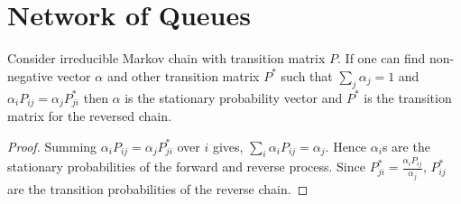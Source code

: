 \documentclass[a4paper,10pt,english]{article}
\begin{document}
\section{Network of Queues}
\begin{thm}
Consider irreducible Markov chain with transition matrix $P$. If one can find non-negative vector $\alpha$ and other transition matrix $P^*$ such that $\sum_j \alpha_j =1$ and $\alpha_iP_{ij}=\alpha_jP^*_{ji}$ then $\alpha$ is the stationary probability vector and $P^*$ is the transition matrix for the reversed chain.
\end{thm}
\begin{proof}
Summing $\alpha_iP_{ij}=\alpha_jP_{ji}^*$ over $i$ gives, $\sum_{i}\alpha_iP_{ij}=\alpha_j$. Hence $\alpha_i$s are the stationary probabilities of the forward and reverse process. Since $P_{ji}^*=\frac{\alpha_iP_{ij}}{\alpha_j}$, $P_{ij}^*$ are the transition probabilities of the reverse chain.
\end{proof} 
\end{document}
